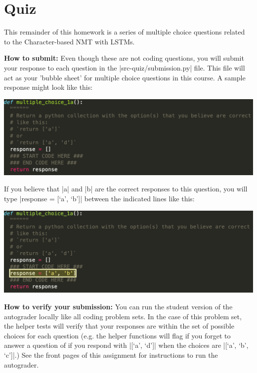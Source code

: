 \section{Quiz}

This remainder of this homework is a series of multiple choice questions related to the Character-based NMT with LSTMs.

{\bf How to submit:}  Even though these are not coding questions, you will submit your response to
each question in the |src-quiz/submission.py| file.  This file will act as
your 'bubble sheet' for multiple choice questions in this course.  A sample response
might look like this:

\begin{center}
\includegraphics[width=1\textwidth]{sample_question_empty.png}
\end{center}

If you believe that |a| and |b| are the correct responses to this question, you
will type |response = [`a', `b']| between the indicated lines like this:

\begin{center}
\includegraphics[width=1\textwidth]{sample_question_complete.png}
\end{center}

{\bf How to verify your submission:}
You can run the student version of the autograder locally like all coding
problem sets.  In the case of this problem set, the helper tests will verify
that your responses are within the set of possible choices for each question
(e.g. the helper functions will flag if you forget to answer a question of if
you respond with |[`a', `d']| when the choices are |[`a', `b', `c']|.)  See the
front pages of this assignment for instructions to run the autograder.
\clearpage

